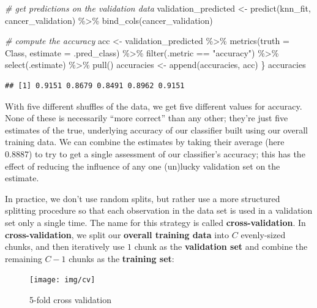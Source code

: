 \documentclass[
]{krantz}
\makeatletter
\newenvironment{Shaded}{\begin{snugshade}}{\end{snugshade}}
\newcommand{\AttributeTok}[1]{\textcolor[rgb]{0.61,0.61,0.61}{#1}}
\newcommand{\CommentTok}[1]{\textcolor[rgb]{0.37,0.37,0.37}{\textit{#1}}}
\newcommand{\FunctionTok}[1]{\textcolor[rgb]{0,0,0}{#1}}
\newcommand{\NormalTok}[1]{#1}
\newcommand{\OtherTok}[1]{\textcolor[rgb]{0.37,0.37,0.37}{#1}}
\newcommand{\SpecialCharTok}[1]{\textcolor[rgb]{0,0,0}{#1}}
\newcommand{\StringTok}[1]{\textcolor[rgb]{0.5,0.5,0.5}{#1}}
\newenvironment{kframe}{%
\medskip{}
\setlength{\fboxsep}{.8em}
 \def\at@end@of@kframe{}%
 \ifinner\ifhmode%
  \def\at@end@of@kframe{\end{minipage}}%
  \begin{minipage}{\columnwidth}%
 \fi\fi%
 \def\FrameCommand##1{\hskip\@totalleftmargin \hskip-\fboxsep
 \colorbox{shadecolor}{##1}\hskip-\fboxsep
     \hskip-\linewidth \hskip-\@totalleftmargin \hskip\columnwidth}%
 \MakeFramed {\advance\hsize-\width
   \@totalleftmargin\z@ \linewidth\hsize
   \@setminipage}}%
 {\par\unskip\endMakeFramed%
 \at@end@of@kframe}
\renewenvironment{Shaded}{\begin{kframe}}{\end{kframe}}
\makeatother
\begin{document}
\begin{Shaded}
\begin{Highlighting}[]
  \CommentTok{\# get predictions on the validation data}
\NormalTok{  validation\_predicted }\OtherTok{\textless{}{-}} \FunctionTok{predict}\NormalTok{(knn\_fit, cancer\_validation) }\SpecialCharTok{\%\textgreater{}\%}
    \FunctionTok{bind\_cols}\NormalTok{(cancer\_validation)}

  \CommentTok{\# compute the accuracy}
\NormalTok{  acc }\OtherTok{\textless{}{-}}\NormalTok{ validation\_predicted }\SpecialCharTok{\%\textgreater{}\%}
    \FunctionTok{metrics}\NormalTok{(}\AttributeTok{truth =}\NormalTok{ Class, }\AttributeTok{estimate =}\NormalTok{ .pred\_class) }\SpecialCharTok{\%\textgreater{}\%}
    \FunctionTok{filter}\NormalTok{(.metric }\SpecialCharTok{==} \StringTok{"accuracy"}\NormalTok{) }\SpecialCharTok{\%\textgreater{}\%}
    \FunctionTok{select}\NormalTok{(.estimate) }\SpecialCharTok{\%\textgreater{}\%}
    \FunctionTok{pull}\NormalTok{()}
\NormalTok{  accuracies }\OtherTok{\textless{}{-}} \FunctionTok{append}\NormalTok{(accuracies, acc)}
\NormalTok{\}}
\NormalTok{accuracies}
\end{Highlighting}
\end{Shaded}

\begin{verbatim}
## [1] 0.9151 0.8679 0.8491 0.8962 0.9151
\end{verbatim}

With five different shuffles of the data, we get five different values for
accuracy. None of these is necessarily ``more correct'' than any other; they're
just five estimates of the true, underlying accuracy of our classifier built
using our overall training data. We can combine the estimates by taking their
average (here 0.8887) to try to get a single assessment of our
classifier's accuracy; this has the effect of reducing the influence of any one
(un)lucky validation set on the estimate.

In practice, we don't use random splits, but rather use a more structured
splitting procedure so that each observation in the data set is used in a
validation set only a single time. The name for this strategy is called
\textbf{cross-validation}. In \textbf{cross-validation}, we split our \textbf{overall training
data} into \(C\) evenly-sized chunks, and then iteratively use \(1\) chunk as the
\textbf{validation set} and combine the remaining \(C-1\) chunks
as the \textbf{training set}:

\begin{figure}
\texttt{[image: img/cv]} \caption{5-fold cross validation}\label{fig:06-cv-image}
\end{figure}
\end{document}
